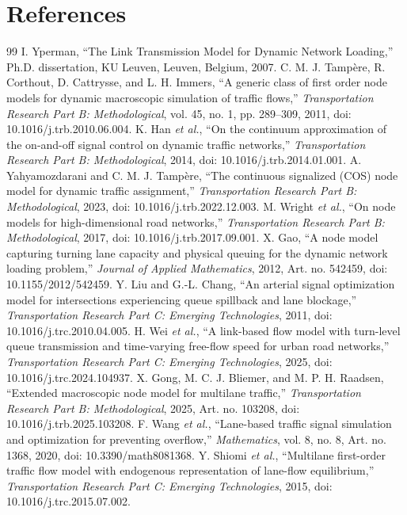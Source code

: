 \documentclass[11pt,a4paper]{article}
\begin{document}
\section*{References}
\begin{thebibliography}{99}
 I. Yperman, ``The Link Transmission Model for Dynamic Network Loading,'' Ph.D. dissertation, KU Leuven, Leuven, Belgium, 2007.
 C. M. J. Tampère, R. Corthout, D. Cattrysse, and L. H. Immers, ``A generic class of first order node models for dynamic macroscopic simulation of traffic flows,'' \emph{Transportation Research Part B: Methodological}, vol. 45, no. 1, pp. 289--309, 2011, doi: 10.1016/j.trb.2010.06.004.
 K. Han \emph{et al.}, ``On the continuum approximation of the on-and-off signal control on dynamic traffic networks,'' \emph{Transportation Research Part B: Methodological}, 2014, doi: 10.1016/j.trb.2014.01.001.
 A. Yahyamozdarani and C. M. J. Tampère, ``The continuous signalized (COS) node model for dynamic traffic assignment,'' \emph{Transportation Research Part B: Methodological}, 2023, doi: 10.1016/j.trb.2022.12.003.
 M. Wright \emph{et al.}, ``On node models for high-dimensional road networks,'' \emph{Transportation Research Part B: Methodological}, 2017, doi: 10.1016/j.trb.2017.09.001.
 X. Gao, ``A node model capturing turning lane capacity and physical queuing for the dynamic network loading problem,'' \emph{Journal of Applied Mathematics}, 2012, Art. no. 542459, doi: 10.1155/2012/542459.
 Y. Liu and G.-L. Chang, ``An arterial signal optimization model for intersections experiencing queue spillback and lane blockage,'' \emph{Transportation Research Part C: Emerging Technologies}, 2011, doi: 10.1016/j.trc.2010.04.005.
 H. Wei \emph{et al.}, ``A link-based flow model with turn-level queue transmission and time-varying free-flow speed for urban road networks,'' \emph{Transportation Research Part C: Emerging Technologies}, 2025, doi: 10.1016/j.trc.2024.104937.
 X. Gong, M. C. J. Bliemer, and M. P. H. Raadsen, ``Extended macroscopic node model for multilane traffic,'' \emph{Transportation Research Part B: Methodological}, 2025, Art. no. 103208, doi: 10.1016/j.trb.2025.103208.
 F. Wang \emph{et al.}, ``Lane-based traffic signal simulation and optimization for preventing overflow,'' \emph{Mathematics}, vol. 8, no. 8, Art. no. 1368, 2020, doi: 10.3390/math8081368.
 Y. Shiomi \emph{et al.}, ``Multilane first-order traffic flow model with endogenous representation of lane-flow equilibrium,'' \emph{Transportation Research Part C: Emerging Technologies}, 2015, doi: 10.1016/j.trc.2015.07.002.

\end{thebibliography}
\end{document}
